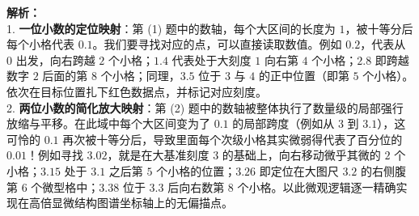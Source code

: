 \begin{center}
\end{center}

\vspace{0.8cm}

{\small\color{gray}
\textbf{解析：}\\
1. \textbf{一位小数的定位映射}：第 (1) 题中的数轴，每个大区间的长度为 $1$，被十等分后每个小格代表 $0.1$。我们要寻找对应的点，可以直接读取数值。例如 $0.2$，代表从 $0$ 出发，向右跨越 $2$ 个小格；$1.4$ 代表处于大刻度 $1$ 向右第 $4$ 个小格；$2.8$ 即跨越数字 $2$ 后面的第 $8$ 个小格；同理，$3.5$ 位于 $3$ 与 $4$ 的正中位置（即第 $5$ 个小格）。依次在目标位置扎下红色数据点，并标记对应刻度。\\
2. \textbf{两位小数的简化放大映射}：第 (2) 题中的数轴被整体执行了数量级的局部强行放缩与平移。在此域中每个大区间变为了 $0.1$ 的局部跨度（例如从 $3$ 到 $3.1$），这可怜的 $0.1$ 再次被十等分后，导致里面每个次级小格其实微弱得代表了百分位的 $0.01$！例如寻找 $3.02$，就是在大基准刻度 $3$ 的基础上，向右移动微乎其微的 $2$ 个小格；$3.15$ 处于 $3.1$ 之后第 $5$ 个小格的位置；$3.26$ 即定位在大图尺 $3.2$ 的右侧腹第 $6$ 个微型格中；$3.38$ 位于 $3.3$ 后向右数第 $8$ 个小格。以此微观逻辑逐一精确实现在高倍显微结构图谱坐标轴上的无偏描点。
}

\vspace{0.6cm}

